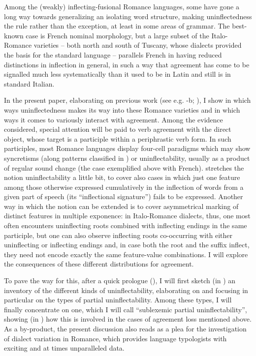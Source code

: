\documentclass[output=paper]{langscibook}
\begin{document}
Among the (weakly) inflecting-fusional Romance languages, some have gone a long way towards generalizing an isolating word structure, making uninflectedness the rule rather than the exception, at least in some areas of grammar. The best-known case is French nominal morphology, but a large subset of the Italo-Romance varieties – both north and south of Tuscany, whose dialects provided the basis for the standard language – parallels French in having reduced distinctions in inflection in general, in such a way that agreement has come to be signalled much less systematically than it used to be in Latin and still is in standard Italian.

In the present paper, elaborating on previous work (see e.g. \citealt{Loporcaro2010a}-b; \citealt{LoporcaroPaciaroni2021}), I show in which ways uninflectedness makes its way into these Romance varieties and in which ways it comes to variously interact with agreement. Among the evidence considered, special attention will be paid to verb agreement with the direct object, whose target is a participle within a periphrastic verb form. In such participles, most Romance languages display four-cell paradigms which may show syncretisms (along patterns classified in \citealt{Loporcaro2011}) or uninflectability, usually as a product of regular sound change (the case exemplified above with French). \citet[143]{Spencer2020} stretches the notion uninflectability a little bit, to cover also cases in which just one feature among those otherwise expressed cumulatively in the inflection of words from a given part of speech (its “inflectional signature”) fails to be expressed. Another way in which the notion can be extended is to cover asymmetrical marking of distinct features in multiple exponence: in Italo-Romance dialects, thus, one most often encounters uninflecting roots combined with inflecting endings in the same participle, but one can also observe inflecting roots co-occurring with either uninflecting or inflecting endings and, in case both the root and the suffix inflect, they need not encode exactly the same feature-value combinations. I will explore the consequences of these different distributions for agreement.

To pave the way for this, after a quick prologue (), I will first sketch (in ) an inventory of the different kinds of uninflectability, elaborating on \citet{Spencer2020} and focusing in particular on the types of partial uninflectability. Among these types, I will finally concentrate on one, which I will call “sublexemic partial uninflectability”, showing (in ) how this is involved in the cases of agreement loss mentioned above. As a by-product, the present discussion also reads as a plea for the investigation of dialect variation in Romance, which provides language typologists with exciting and at times unparalleled data.
\end{document}
